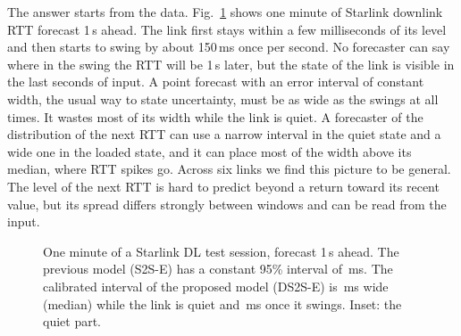The answer starts from the data. Fig.~\ref{fig:trace} shows one minute of Starlink downlink RTT forecast 1\,s ahead. The link first stays within a few milliseconds of its level and then starts to swing by about 150\,ms once per second. No forecaster can say where in the swing the RTT will be 1\,s later, but the state of the link is visible in the last seconds of input. A point forecast with an error interval of constant width, the usual way to state uncertainty, must be as wide as the swings at all times. It wastes most of its width while the link is quiet. A forecaster of the distribution of the next RTT can use a narrow interval in the quiet state and a wide one in the loaded state, and it can place most of the width above its median, where RTT spikes go. Across six links we find this picture to be general. The level of the next RTT is hard to predict beyond a return toward its recent value, but its spread differs strongly between windows and can be read from the input.

\begin{figure}[t]
  \centering
  
  \caption{One minute of a Starlink DL test session, forecast 1\,s ahead. The previous model (S2S-E) has a constant 95\% interval of \TraceWidS\,ms. The calibrated interval of the proposed model (DS2S-E) is \TraceWidDCalm\,ms wide (median) while the link is quiet and \TraceWidDLoad\,ms once it swings. Inset: the quiet part.}
  \label{fig:trace}
\end{figure}

